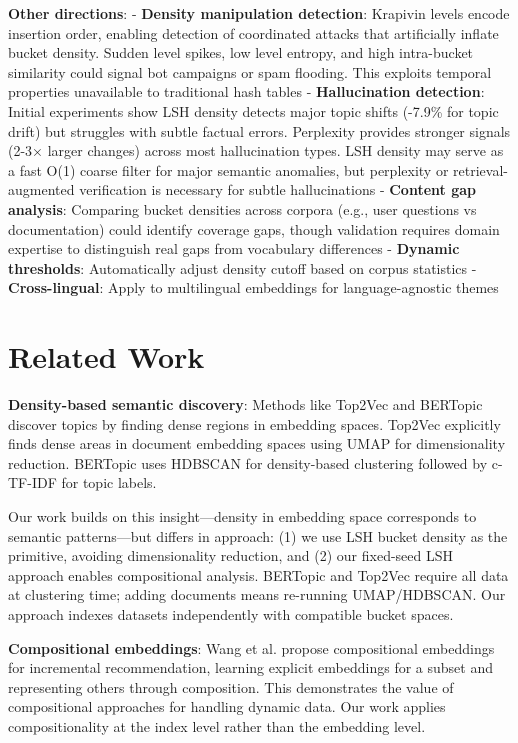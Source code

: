 \documentclass[
]{article}
\begin{document}
\textbf{Other directions}: - \textbf{Density manipulation detection}:
Krapivin levels encode insertion order, enabling detection of
coordinated attacks that artificially inflate bucket density. Sudden
level spikes, low level entropy, and high intra-bucket similarity could
signal bot campaigns or spam flooding. This exploits temporal properties
unavailable to traditional hash tables - \textbf{Hallucination
detection}: Initial experiments show LSH density detects major topic
shifts (-7.9\% for topic drift) but struggles with subtle factual
errors. Perplexity provides stronger signals (2-3× larger changes)
across most hallucination types. LSH density may serve as a fast O(1)
coarse filter for major semantic anomalies, but perplexity or
retrieval-augmented verification is necessary for subtle hallucinations
- \textbf{Content gap analysis}: Comparing bucket densities across
corpora (e.g., user questions vs documentation) could identify coverage
gaps, though validation requires domain expertise to distinguish real
gaps from vocabulary differences - \textbf{Dynamic thresholds}:
Automatically adjust density cutoff based on corpus statistics -
\textbf{Cross-lingual}: Apply to multilingual embeddings for
language-agnostic themes

\section{Related Work}\label{related-work}

\textbf{Density-based semantic discovery}: Methods like Top2Vec
\autocite{angelov2020top2vec} and BERTopic
\autocite{grootendorst2022bertopic} discover topics by finding dense
regions in embedding spaces. Top2Vec explicitly finds dense areas in
document embedding spaces using UMAP \autocite{mcinnes2018umap} for
dimensionality reduction. BERTopic uses HDBSCAN
\autocite{mcinnes2017hdbscan} for density-based clustering followed by
c-TF-IDF for topic labels.

Our work builds on this insight---density in embedding space corresponds
to semantic patterns---but differs in approach: (1) we use LSH bucket
density as the primitive, avoiding dimensionality reduction, and (2) our
fixed-seed LSH approach enables compositional analysis. BERTopic and
Top2Vec require all data at clustering time; adding documents means
re-running UMAP/HDBSCAN. Our approach indexes datasets independently
with compatible bucket spaces.

\textbf{Compositional embeddings}: Wang et al.
\autocite{wang2022lightweight} propose compositional embeddings for
incremental recommendation, learning explicit embeddings for a subset
and representing others through composition. This demonstrates the value
of compositional approaches for handling dynamic data. Our work applies
compositionality at the index level rather than the embedding level.
\end{document}

